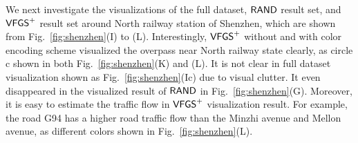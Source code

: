 We next investigate the visualizations of the full dataset, $\mathsf{RAND}$ result set, and $\mathsf{VFGS}^{+}$ result set around North railway station of Shenzhen, which are shown from Fig.~\ref{fig:shenzhen}(I) to (L).
Interestingly, $\mathsf{VFGS}^{+}$ without and with color encoding scheme visualized the overpass near North railway state clearly, as circle c shown in both Fig.~\ref{fig:shenzhen}(K) and (L).
It is not clear in full dataset visualization shown as Fig.~\ref{fig:shenzhen}(Ic) due to visual clutter.
It even disappeared in the visualized result of $\mathsf{RAND}$ in Fig.~\ref{fig:shenzhen}(G).
Moreover, it is easy to estimate the traffic flow in $\mathsf{VFGS}^{+}$ visualization result.
For example, the road G94 has a higher road traffic flow than the Minzhi avenue and Mellon avenue, as different colors shown in Fig.~\ref{fig:shenzhen}(L).









